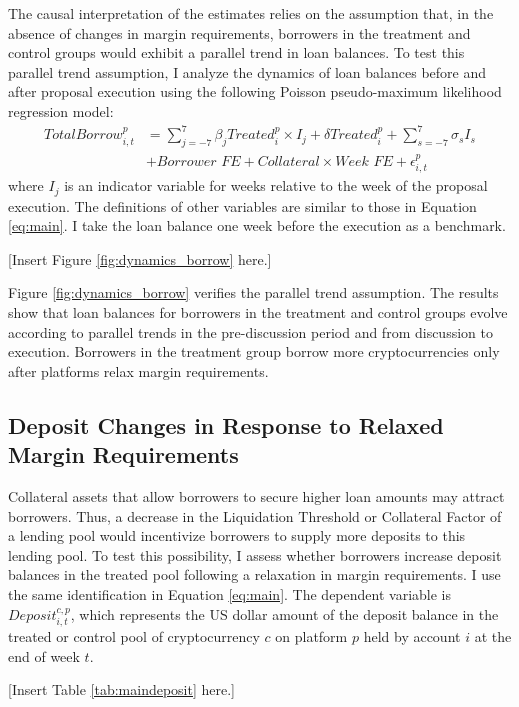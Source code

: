 \documentclass[12pt]{article}
\begin{document}
The causal interpretation of the estimates relies on the assumption that, in the
absence of changes in margin requirements, borrowers in the treatment and control groups would exhibit a parallel trend in loan balances. To test this parallel trend assumption, I analyze the dynamics of loan balances before and after proposal execution using the following Poisson pseudo-maximum likelihood regression model:
\begin{align}
     \nonumber TotalBorrow_{i,t}^p&=\sum_{j=-7}^{7}\beta_jTreated_{i}^p\times I_j+\delta Treated_{i}^p+\sum_{s=-7}^{7}\sigma_sI_s\\ &+\textit{Borrower FE} + \textit{Collateral}\times\textit{Week FE}+\epsilon_{i,t}^p\label{eq:dynamics}
\end{align}
where $I_j$ is an indicator variable for weeks relative to the week of the proposal execution. The definitions of other variables are similar to those in Equation \ref{eq:main}. I take the loan balance one week before the execution as a benchmark.

\centerline{[Insert Figure \ref{fig:dynamics_borrow} here.]}

Figure \ref{fig:dynamics_borrow} verifies the parallel trend assumption. The results show that
loan balances for borrowers in the treatment and control groups evolve according to parallel trends in
the pre-discussion period and from discussion to execution. Borrowers in the treatment group borrow more cryptocurrencies only after platforms relax margin requirements. 

\subsection{Deposit Changes in Response to Relaxed Margin Requirements}

Collateral assets that allow borrowers to secure higher loan amounts may attract borrowers. Thus, a decrease in the Liquidation Threshold or Collateral Factor of a lending pool would incentivize borrowers to supply more deposits to this lending pool. To test this possibility, I assess whether borrowers increase deposit balances in the treated pool following a relaxation in margin requirements. I use the same identification in Equation \ref{eq:main}. The dependent variable is $Deposit_{i,t}^{c,p}$, which represents the US dollar amount of the deposit balance in the treated or control pool of cryptocurrency $c$ on platform $p$ held by account $i$ at the end of week $t$.

\centerline{[Insert Table \ref{tab:maindeposit} here.]}
\end{document}
